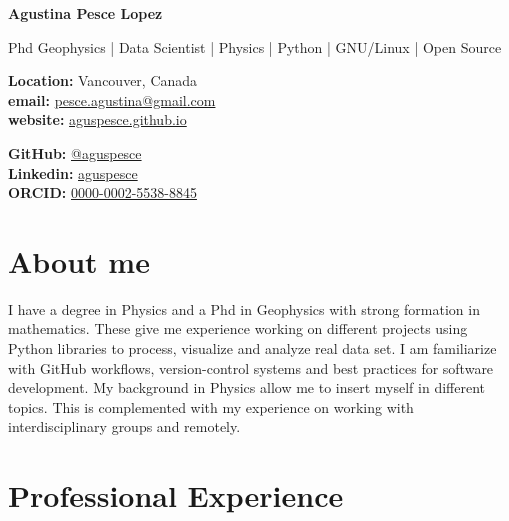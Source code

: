\documentclass[10pt, a4paper]{article}
\makeatletter
\newcommand{\firstname}{Agustina}
\newcommand{\familyname}{Pesce Lopez}
\newcommand{\email}{pesce.agustina@gmail.com}
\newcommand{\website}{aguspesce.github.io}
\newcommand{\github}{aguspesce}
\newcommand{\linkedin}{aguspesce}
\newcommand{\orcid}{0000-0002-5538-8845}
\newcommand{\fullname}{\firstname{} \familyname}
\newcommand{\maintitle}[1]{
    \begin{center}
        \textbf{\Huge #1}
    \end{center}
}
\newcommand{\subtitle}[1]{
    \begin{center}
        {\large #1}
    \end{center}
}
\newcommand{\affiliation}[1]{
    \begin{center}
        {#1}
    \end{center}
}
\newcommand{\entriespad}{0.75em}
\newcommand{\MAIL}[1]{\href{mailto:#1}{#1}}
\newcommand{\GITHUB}[1]{\href{https://github.com/#1}{@#1}}
\newcommand{\ORCID}[1]{\href{https://orcid.org/#1}{#1}}
\newcommand{\WEBSITE}[1]{\href{https://#1}{#1}}
\newcommand{\LINKEDIN}[1]{\href{https://linkedin.com/in/#1}{#1}}
\makeatother
\begin{document}
\maintitle{\fullname}
\subtitle{Phd Geophysics | Data Scientist | Physics | Python | GNU/Linux | Open
Source}
\vspace{\entriespad}

\begin{minipage}[t]{0.60\linewidth}
    \begin{flushleft}
        \textbf{Location:} Vancouver, Canada
        \\
        \textbf{email:} \MAIL{\email}
        \\
        \textbf{website:} \WEBSITE{\website}
    \end{flushleft}
\end{minipage}
\hfill
\begin{minipage}[t]{0.40\linewidth}
    \begin{flushright}
        \textbf{GitHub:} \GITHUB{\github}
        \\
        \textbf{Linkedin:} \LINKEDIN{\linkedin}
        \\
        \textbf{ORCID:} \ORCID{\orcid}
    \end{flushright}
\end{minipage}

\vspace{\entriespad}


\section{About me}

I have a degree in Physics and a Phd in Geophysics with strong formation in
mathematics.
These give me experience working on different projects using Python libraries
to process, visualize and analyze real data set.
I am familiarize with GitHub workflows, version-control systems and best
practices for software development.
My background in Physics allow me to insert myself in different topics.
This is complemented with my experience on working with interdisciplinary groups
and remotely.


\section{Professional Experience}
\end{document}
